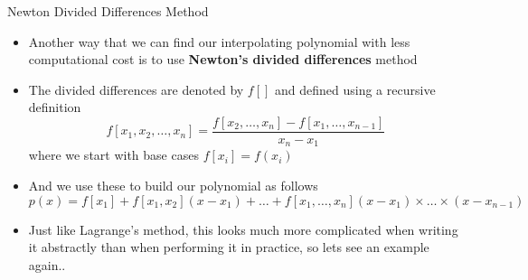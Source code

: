 {}\documentclass[letterpaper,
compress,
xcolor=x11names,
]{beamer}
\begin{document}

\begin{frame}{Newton Divided Differences Method}
	\footnotesize
	\begin{itemize}
		\item Another way that we can find our interpolating polynomial with less computational cost is to use \textbf{Newton's divided differences} method
		\item<2-> The divided differences are denoted by $f[]$ and defined using a recursive definition
		\begin{equation*}
			f[x_1, x_2, \dots, x_n] = \frac{f[x_2,\dots,x_n] - f[x_1,\dots,x_{n-1}]}{x_n - x_1}
		\end{equation*}
		where we start with base cases $f[x_i] = f(x_i)$
		\item<3-> And we use these to build our polynomial as follows
		\begin{equation*}
			p(x) = f[x_1] + f[x_1,x_2](x-x_1) + \dots + f[x_1,\dots,x_n](x-x_1)\times\dots\times(x-x_{n-1})
		\end{equation*}
		\item<4-> Just like Lagrange's method, this looks much more complicated when writing it abstractly than when performing it in practice, so lets see an example again..
	\end{itemize}
\end{frame}

\end{document}

